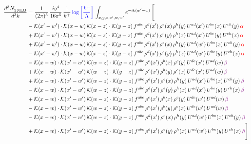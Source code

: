 \documentclass[9pt]{article}
\numberwithin{equation}{section}
\begin{document}
\begin{align}
  \frac{d^{3}N_{1\,\rm NLO}^{\rm}}{d^{3}k}  & = \frac{1}{(2\pi)^{3}}\, \frac{ig^{4}}{16\pi^{5}}\, \frac{1}{k^{+}}\, {\color{blue}\log{\left[\frac{k^{+}}{\Lambda}\right]}}\,\int_{x,y,z,x^{\prime},w,w^{\prime}}e^{-ik(w^{\prime}-w)}\, \Bigg[\notag \\ & -\mathcal{K}(x'-w')\cdot\mathcal{K}(x-w)\,\mathcal{K}(x-z)\cdot\mathcal{K}(y-z)\, f^{abc}\,\rho^{d}(x')\,\rho^{e}(x)\,\rho^{h}(y)\,U^{ad}(x')\,U^{be}(x)\,U^{ch}(y)\,{\color{red}\alpha}\notag\\
&+\mathcal{K}(x'-w')\cdot\mathcal{K}(x-w)\,\mathcal{K}(x-z)\cdot\mathcal{K}(y-z)\, f^{abc}\,\rho^{d}(x')\,\rho^{e}(y)\,\rho^{h}(x)\,U^{ad}(x')\,U^{be}(y)\,U^{ch}(x)\,{\color{red}\alpha}\notag\\ & +\mathcal{K}(x'-w')\cdot\mathcal{K}(x-w)\,\mathcal{K}(x-z)\cdot\mathcal{K}(y-z)\, f^{abc}\,\rho^{d}(x')\,\rho^{e}(x)\,\rho^{h}(y)\,U^{ad}(w')\,U^{be}(x)\,U^{ch}(y)\,{\color{red}\alpha}\notag\\ & -\mathcal{K}(x'-w')\cdot\mathcal{K}(x-w)\,\mathcal{K}(x-z)\cdot\mathcal{K}(y-z)\, f^{abc}\,\rho^{d}(x')\,\rho^{e}(y)\,\rho^{h}(x)\,U^{ad}(w')\,U^{be}(y)\,U^{ch}(x)\,{\color{red}\alpha}\notag\\ & - \mathcal{K}(x-w) \cdot \mathcal{K}(x'-w')\, \mathcal{K}(w-z)\cdot \mathcal{K}(y-z)\, f^{abc}\, \rho^{e}(x')\,\rho^{b}(x)\,\rho^{c}(y)\,U^{de}(x')\,U^{ad}(w)\,{\color{violet} \beta} \notag \\ &  +  \mathcal{K}(x-w) \cdot \mathcal{K}(x'-w')\, \mathcal{K}(w-z)\cdot \mathcal{K}(y-z)\, f^{abc}\, \rho^{e}(x')\,\rho^{b}(y)\,\rho^{c}(x)\,U^{de}(x')\,U^{ad}(w)\,{\color{violet} \beta} \notag \\ & + \mathcal{K}(x-w) \cdot \mathcal{K}(x'-w')\, \mathcal{K}(w-z)\cdot \mathcal{K}(y-z)\, f^{abc}\, \rho^{d}(x')\,\rho^{e}(x)\,\rho^{h}(y)\,U^{ad}(x')\,U^{be}(x)\,U^{ch}(y)\, {\color{violet} \beta} \notag \\ & - \mathcal{K}(x-w) \cdot \mathcal{K}(x'-w')\, \mathcal{K}(w-z)\cdot \mathcal{K}(y-z)\, f^{abc}\, \rho^{d}(x')\,\rho^{e}(y)\,\rho^{h}(x)\,U^{ad}(x')\,U^{be}(y)\,U^{ch}(x)\, {\color{violet} \beta} \notag \\ & + \mathcal{K}(x-w) \cdot \mathcal{K}(x'-w')\, \mathcal{K}(w-z)\cdot \mathcal{K}(y-z)\, f^{abc}\, \rho^{e}(x')\,\rho^{b}(x)\,\rho^{c}(y)\,U^{de}(w')\,U^{ad}(w)\,{\color{violet} \beta} \notag \\ & - \mathcal{K}(x-w) \cdot \mathcal{K}(x'-w')\, \mathcal{K}(w-z)\cdot \mathcal{K}(y-z)\, f^{abc}\, \rho^{e}(x')\,\rho^{b}(y)\,\rho^{c}(x)\,U^{de}(w')\,U^{ad}(w)\, {\color{violet} \beta} \notag \\ & - \mathcal{K}(x-w) \cdot \mathcal{K}(x'-w')\, \mathcal{K}(w-z)\cdot \mathcal{K}(y-z)\, f^{abc}\, \rho^{d}(x')\,\rho^{e}(x)\,\rho^{h}(y)\,U^{ad}(w')\,U^{be}(x)\,U^{ch}(y)\, {\color{violet} \beta} \notag \\ & + \mathcal{K}(x-w) \cdot \mathcal{K}(x'-w')\, \mathcal{K}(w-z)\cdot \mathcal{K}(y-z)\, f^{abc}\, \rho^{d}(x')\,\rho^{e}(y)\,\rho^{h}(x)\,U^{ad}(w')\,U^{be}(y)\,U^{ch}(x)\, {\color{violet} \beta} \Bigg]
\end{align}
\end{document}
